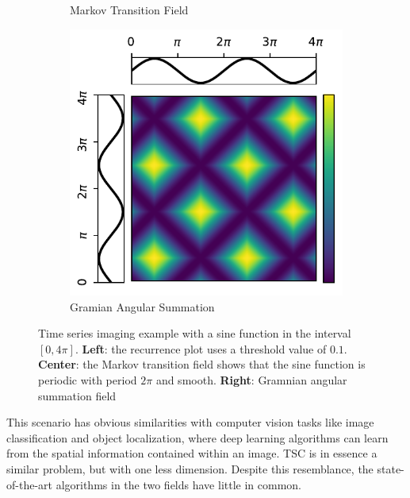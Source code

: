 \begin{figure}[!htb]
\begin{center}
\begin{subfigure}[b]{0.32\linewidth}
            \caption{Markov Transition Field}
        \end{subfigure}
        \hfill
        \begin{subfigure}[b]{0.32\linewidth}
            \centering
            \includegraphics[width=\linewidth]{figures/imaging_3.pdf}
            \caption{Gramian Angular Summation}
        \end{subfigure}
        \hfill
        \caption{Time series imaging example with a sine function in the interval $[0,4\pi]$. \textbf{Left}: the recurrence plot uses a threshold value of $0.1$. \textbf{Center}: the Markov transition field shows that the sine function is periodic with period $2\pi$ and smooth. \textbf{Right}: Gramnian angular summation field}
    \label{fig:imaging_ts}
    \end{center}
\end{figure}

\begin{remark}
    This scenario has obvious similarities with computer vision tasks like image classification and object localization, where deep learning algorithms can learn from the spatial information contained within an image. TSC is in essence a similar problem, but with one less dimension. Despite this resemblance, the state-of-the-art algorithms in the two fields have little in common.
\end{remark}
    

